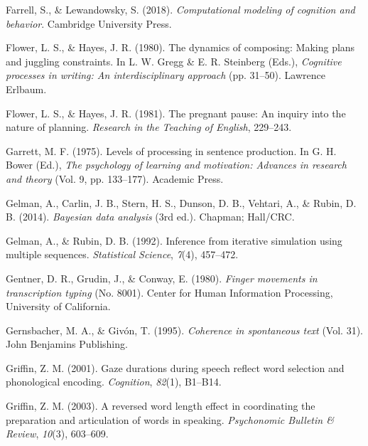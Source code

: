 \documentclass[
  man,floatsintext]{apa7}
\newlength{\cslhangindent}
\newlength{\cslentryspacingunit} %
\newenvironment{CSLReferences}[2] %
 {%
  \setlength{\parindent}{0pt}
  \ifodd #1
  \let\oldpar\par
  \def\par{\hangindent=\cslhangindent\oldpar}
  \fi
  \setlength{\parskip}{#2\cslentryspacingunit}
 }%
 {}
\begin{document}
\begin{CSLReferences}{1}{0}
\leavevmode{}%
Farrell, S., \& Lewandowsky, S. (2018). \emph{Computational modeling of cognition and behavior}. Cambridge University Press.

\leavevmode{}%
Flower, L. S., \& Hayes, J. R. (1980). The dynamics of composing: Making plans and juggling constraints. In L. W. Gregg \& E. R. Steinberg (Eds.), \emph{Cognitive processes in writing: An interdisciplinary approach} (pp. 31--50). Lawrence Erlbaum.

\leavevmode{}%
Flower, L. S., \& Hayes, J. R. (1981). The pregnant pause: An inquiry into the nature of planning. \emph{Research in the Teaching of English}, 229--243.

\leavevmode{}%
Garrett, M. F. (1975). Levels of processing in sentence production. In G. H. Bower (Ed.), \emph{The psychology of learning and motivation: Advances in research and theory} (Vol. 9, pp. 133--177). Academic Press.

\leavevmode{}%
Gelman, A., Carlin, J. B., Stern, H. S., Dunson, D. B., Vehtari, A., \& Rubin, D. B. (2014). \emph{Bayesian data analysis} (3rd ed.). Chapman; Hall/CRC.

\leavevmode{}%
Gelman, A., \& Rubin, D. B. (1992). Inference from iterative simulation using multiple sequences. \emph{Statistical Science}, \emph{7}(4), 457--472.

\leavevmode{}%
Gentner, D. R., Grudin, J., \& Conway, E. (1980). \emph{Finger movements in transcription typing} (No. 8001). Center for Human Information Processing, University of California.

\leavevmode{}%
Gernsbacher, M. A., \& Givón, T. (1995). \emph{Coherence in spontaneous text} (Vol. 31). John Benjamins Publishing.

\leavevmode{}%
Griffin, Z. M. (2001). Gaze durations during speech reflect word selection and phonological encoding. \emph{Cognition}, \emph{82}(1), B1--B14.

\leavevmode{}%
Griffin, Z. M. (2003). A reversed word length effect in coordinating the preparation and articulation of words in speaking. \emph{Psychonomic Bulletin \& Review}, \emph{10}(3), 603--609.


\end{CSLReferences}
\end{document}
